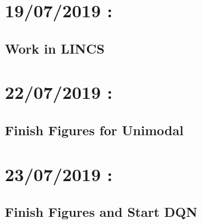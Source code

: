 \documentclass[a4paper,10pt]{article}
\begin{document}
  	\section{19/07/2019 :}
  		\subsection{Work in LINCS}
  			
 
  	\section{22/07/2019 :}
  		\subsection{Finish Figures for Unimodal}
  			
  			
  			
  	\section{23/07/2019 :}
  		\subsection{Finish Figures and Start DQN}
  			
  			

\clearpage


\end{document}
